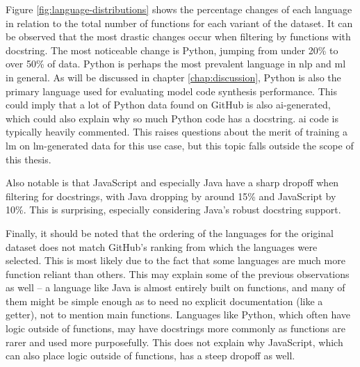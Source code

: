 Figure \ref{fig:language-distributions} shows the percentage changes of each language in relation to the total number of functions for each variant of the dataset.
It can be observed that the most drastic changes occur when filtering by functions with docstring.
The most noticeable change is Python, jumping from under 20\% to over 50\% of data.
Python is perhaps the most prevalent language in \ac{nlp} and \ac{ml} in general.
As will be discussed in chapter \ref{chap:discussion}, Python is also the primary language used for evaluating model code synthesis performance.
This could imply that a lot of Python data found on GitHub is also \ac{ai}-generated, which could also explain why so much Python code has a docstring.
\ac{ai} code is typically heavily commented.
This raises questions about the merit of training a \ac{lm} on \ac{lm}-generated data for this use case, but this topic falls outside the scope of this thesis.

Also notable is that JavaScript and especially Java have a sharp dropoff when filtering for docstrings, with Java dropping by around 15\% and JavaScript by 10\%.
This is surprising, especially considering Java's robust docstring support.

Finally, it should be noted that the ordering of the languages for the original dataset does not match GitHub's ranking from which the languages were selected.
This is most likely due to the fact that some languages are much more function reliant than others.
This may explain some of the previous observations as well -- a language like Java is almost entirely built on functions, and many of them might be simple enough as to need no explicit documentation (like a getter), not to mention main functions.
Languages like Python, which often have logic outside of functions, may have docstrings more commonly as functions are rarer and used more purposefully.
This does not explain why JavaScript, which can also place logic outside of functions, has a steep dropoff as well.

